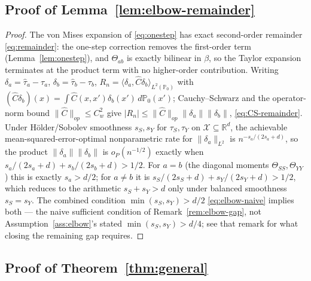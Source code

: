 \documentclass[11pt]{article}
\theoremstyle{plain}
\theoremstyle{definition}
\theoremstyle{remark}
\newcommand{\PP}{\mathbb{P}}
\newcommand{\R}{\mathbb{R}}
\newcommand{\cX}{\mathcal{X}}
\begin{document}
\subsection{Proof of Lemma~\ref{lem:elbow-remainder}}\label{app:proof-elbow}

\begin{proof}
The von Mises expansion of \eqref{eq:onestep} has exact second-order remainder
\eqref{eq:remainder}: the one-step correction removes the first-order term
(Lemma~\ref{lem:onestep}), and $\Theta_{ab}$ is exactly bilinear in $\beta$, so the
Taylor expansion terminates at the product term with no higher-order contribution.
Writing $\delta_a=\hat\tau_a-\tau_a$, $\delta_b=\hat\tau_b-\tau_b$,
$R_n=\langle\delta_a,\hat C\delta_b\rangle_{L^2(\PP_0)}$ with
$(\hat C\delta_b)(x)=\int\hat C(x,x')\delta_b(x')\,d\PP_0(x')$; Cauchy--Schwarz and the
operator-norm bound $\|\hat C\|_{op}\le C_w^2$ give
$|R_n|\le\|\hat C\|_{op}\|\delta_a\|\|\delta_b\|$, \eqref{eq:CS-remainder}. Under
H\"older/Sobolev smoothness $s_S,s_Y$ for $\tau_S,\tau_Y$ on $\cX\subseteq\R^d$, the
achievable mean-squared-error-optimal nonparametric rate for $\|\delta_a\|_{L^2}$ is
$n^{-s_a/(2s_a+d)}$, so the product $\|\delta_a\|\|\delta_b\|$ is $o_P(n^{-1/2})$
exactly when $s_a/(2s_a+d)+s_b/(2s_b+d)>1/2$. For $a=b$ (the diagonal moments
$\Theta_{SS},\Theta_{YY}$) this is exactly $s_a>d/2$; for $a\ne b$ it is
$s_S/(2s_S+d)+s_Y/(2s_Y+d)>1/2$, which reduces to the arithmetic $s_S+s_Y>d$ only
under balanced smoothness $s_S=s_Y$. The combined condition $\min(s_S,s_Y)>d/2$
\eqref{eq:elbow-naive} implies both --- the naive sufficient condition of
Remark~\ref{rem:elbow-gap}, not Assumption~\ref{ass:elbow}'s stated
$\min(s_S,s_Y)>d/4$; see that remark for what closing the remaining gap requires.
\end{proof}

\subsection{Proof of Theorem~\ref{thm:general}}\label{app:proof-general}
\end{document}
